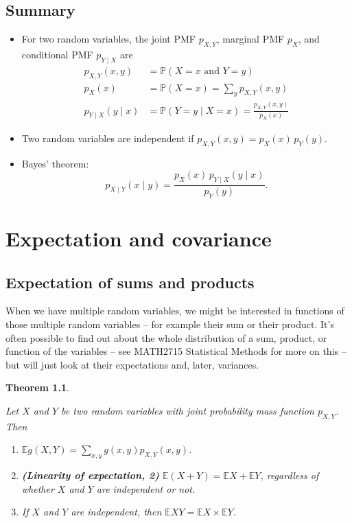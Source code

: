 \documentclass[
  a4paper,
]{book}
\providecommand{\tightlist}{%
  \setlength{\itemsep}{0pt}\setlength{\parskip}{0pt}}
\newtheorem{theorem}{Theorem}[chapter]
\theoremstyle{definition}
\theoremstyle{definition}
\theoremstyle{definition}
\theoremstyle{definition}
\theoremstyle{remark}
\begin{document}
\hypertarget{summary-L13}{%
\section*{Summary}\label{summary-L13}}

\begin{itemize}
\tightlist
\item
  For two random variables, the joint PMF \(p_{X,Y}\), marginal PMF \(p_X\), and conditional PMF \(p_{Y \mid X}\) are
  \begin{align*}
  p_{X,Y}(x,y) &= \mathbb P(X =x \text{ and } Y = y) \\
  p_X(x) &= \mathbb P(X = x) = \sum_y p_{X,Y}(x,y) \\
  p_{Y \mid X}(y \mid x) &= \mathbb P(Y = y \mid X = x) = \frac{p_{X,Y}(x,y)}{p_X(x)} 
  \end{align*}
\item
  Two random variables are independent if \(p_{X,Y}(x,y) = p_X(x) \, p_Y(y)\).
\item
  Bayes' theorem:
  \[ p_{X \mid Y}(x \mid y) = \frac{ p_X(x) \, p_{Y \mid X}(y \mid x)}{p_Y(y)} . \]
\end{itemize}

\hypertarget{L14-covariance}{%
\chapter{Expectation and covariance}\label{L14-covariance}}

\hypertarget{sum-product}{%
\section{Expectation of sums and products}\label{sum-product}}

When we have multiple random variables, we might be interested in functions of those multiple random variables -- for example their sum or their product. It's often possible to find out about the whole distribution of a sum, product, or function of the variables -- see MATH2715 Statistical Methods for more on this -- but will just look at their expectations and, later, variances.

\begin{theorem}
\protect\hypertarget{thm:linearity2}{}\label{thm:linearity2}

Let \(X\) and \(Y\) be two random variables with joint probability mass function \(p_{X,Y}\). Then

\begin{enumerate}
\def\labelenumi{\arabic{enumi}.}
\tightlist
\item
  \(\mathbb Eg(X,Y) = \displaystyle\sum_{x,y} g(x,y) p_{X,Y}(x,y)\).
\item
  \textbf{(Linearity of expectation, 2)} \(\mathbb E(X + Y) = \mathbb EX + \mathbb EY\), regardless of whether \(X\) and \(Y\) are independent or not.
\item
  If \(X\) and \(Y\) are independent, then \(\mathbb EXY = \mathbb EX \times \mathbb EY\).
\end{enumerate}

\end{theorem}
\end{document}
